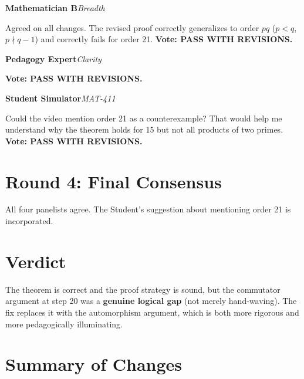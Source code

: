 \documentclass[11pt]{article}
\newcommand{\agent}[3]{%
  \medskip\noindent
  \textcolor{#1}{\textbf{#2}}\hfill\textcolor{#1}{\textit{#3}}\par\smallskip
}
\begin{document}
\bigskip
\agent{breadthgreen}{Mathematician B}{Breadth}

Agreed on all changes. The revised proof correctly generalizes to order $pq$ ($p < q$, $p \nmid q-1$) and correctly fails for order 21. \textbf{Vote: PASS WITH REVISIONS.}

\bigskip
\agent{pedorange}{Pedagogy Expert}{Clarity}

\textbf{Vote: PASS WITH REVISIONS.}

\bigskip
\agent{studentpurple}{Student Simulator}{MAT-411}

Could the video mention order 21 as a counterexample? That would help me understand why the theorem holds for 15 but not all products of two primes. \textbf{Vote: PASS WITH REVISIONS.}

\section{Round 4: Final Consensus}

All four panelists agree. The Student's suggestion about mentioning order 21 is incorporated.

\section*{Verdict}

\begin{tcolorbox}[colback=green!5, colframe=green!50!black, fonttitle=\bfseries, title={PASS WITH REVISIONS}]
The theorem is correct and the proof strategy is sound, but the commutator argument at step 20 was a \textbf{genuine logical gap} (not merely hand-waving). The fix replaces it with the automorphism argument, which is both more rigorous and more pedagogically illuminating.
\end{tcolorbox}

\section*{Summary of Changes}
\end{document}

